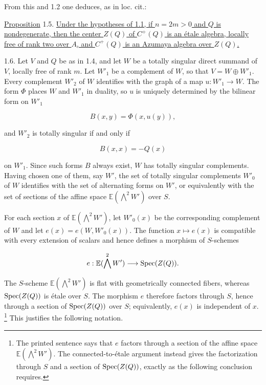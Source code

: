 From this and 1.2 one deduces, as in loc. cit.:

\underline{Proposition} 1.5. \underline{Under the hypotheses of 1.1, if
$n=2m>0$ and $Q$ is nondegenerate, then the center $Z(Q)$ of $C^+(Q)$ is
an étale algebra, locally free of rank two over $A$, and $C^+(Q)$ is an
Azumaya algebra over $Z(Q)$.}

1.6. Let $V$ and $Q$ be as in 1.4, and let $W$ be a totally singular
direct summand of $V$, locally free of rank $m$.  Let $W'_1$ be a
complement of $W$, so that $V=W\oplus W'_1$.  Every complement $W'_2$ of
$W$ identifies with the graph of a map $u:W'_1\to W$.  The form $\Phi$
places $W$ and $W'_1$ in duality, so $u$ is uniquely determined by the
bilinear form on $W'_1$


\begin{equation*}
B(x,y)=\Phi(x,u(y)),
\end{equation*}

and $W'_2$ is totally singular if and only if

\begin{equation*}
B(x,x)=-Q(x)
\end{equation*}

on $W'_1$.  Since such forms $B$ always exist, $W$ has totally singular
complements.  Having chosen one of them, say $W'$, the set of totally
singular complements $W'_0$ of $W$ identifies with the set of alternating
forms on $W'$, or equivalently with the set of sections of the affine
space $\mathbb E(\bigwedge^2W')$ over $S$.

For each section $x$ of $\mathbb E(\bigwedge^2W')$, let $W'_0(x)$ be the
corresponding complement of $W$ and let
$e(x)=e(W,W'_0(x))$.  The function $x\mapsto e(x)$ is compatible with
every extension of scalars and hence defines a morphism of $S$-schemes

\begin{equation*}
e:\mathbb E(\bigwedge^2W')\longrightarrow\operatorname{Spec}(Z(Q)).
\end{equation*}

The $S$-scheme $\mathbb E(\bigwedge^2W')$ is flat with geometrically
connected fibers, whereas $\operatorname{Spec}(Z(Q))$ is étale over $S$.  The morphism
$e$ therefore factors through $S$, hence through a section of
$\operatorname{Spec}(Z(Q))$ over $S$; equivalently, $e(x)$ is independent of $x$.
\footnote{The printed sentence says that $e$ factors through a section of
the affine space $\mathbb E(\bigwedge^2W')$.  The connected-to-étale
argument instead gives the factorization through $S$ and a section of
$\operatorname{Spec}(Z(Q))$, exactly as the following conclusion requires.}
This justifies the following notation.

